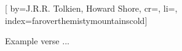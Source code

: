 

[%
    by={J.R.R. Tolkien, Howard Shore},
    cr={},
    li={},
    index={faroverthemistymountainscold}]


    \label{faroverthemistymountainscold}

    \beginverse
        Example verse ...
    \endverse
\endsong
